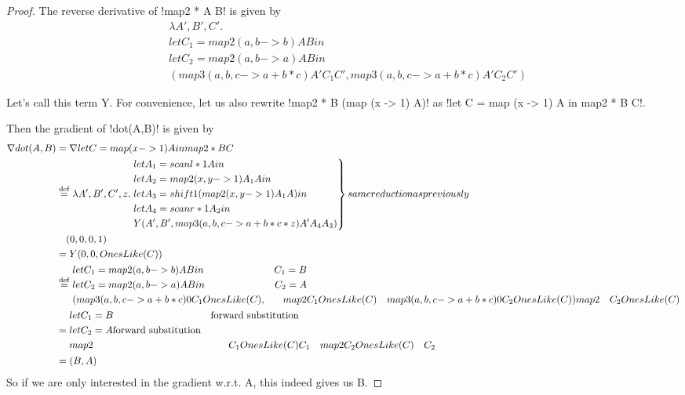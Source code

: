  \begin{proof}
The reverse derivative of !map2 * A B! is given by 
\begin{align*}
    & \lambda A',B',C'. \\
    & let C_1 =map2 (a,b -> b) A B in \\
    & let C_2 =map2 (a,b -> a) A B in \\
    & (map3 (a,b,c -> a+b*c) A' C_1 C', map3 (a,b,c -> a+b*c) A' C_2 C')
\end{align*}

Let's call this term Y.
For convenience, let us also rewrite !map2 * B (map (x -> 1) A)! 
as !let C = map (x -> 1) A in map2 * B C!.

Then the gradient of !dot(A,B)! is given by
\begin{align*}
    \nabla dot(A,B) 
    &= \nabla let C = map (x -> 1) A in map2 * B C\\
    &\stackrel {\mathrm{def}}= \lambda A',B',C',z. 
    \left.\begin{aligned}
        & let A_1 = scanl * 1 A in \\
        & let A_2 = map2 (x,y -> 1) A_1 A in \\
        & let A_3 = shift1 (map2 (x,y -> 1) A_1 A) in \\
        & let A_4 = scanr * 1 A_2 in \\
        & Y(A', B', map3 (a,b,c -> a+b*c*z) A' A_4 A_3)
    \end{aligned}\right\}same reduction as previously
    \\
    &\quad(0,0,0,1) \\
    &= Y(0,0,OnesLike(C)) \\
    &\stackrel {\mathrm{def}}= 
    \begin{aligned}
        & let C_1 =map2 (a,b -> b) A B in & C_1 = B\\
        & let C_2 =map2 (a,b -> a) A B in & C_2 = A\\
        & (map3 (a,b,c -> a+b*c) 0 C_1 OnesLike(C), & map2 & C_1 OnesLike(C)
        & map3 (a,b,c -> a+b*c) 0 C_2 OnesLike(C)) & map2 & C_2 OnesLike(C)
    \end{aligned}\\
    &= \begin{aligned}
        & let C_1 = B & \text{forward substitution}\\
        & let C_2 = A \text{forward substitution}\\
        & map2 & C_1 OnesLike(C) & C_1
        & map2 & C_2 OnesLike(C) & C_2
    \end{aligned}\\
    &= (B, A)
\end{align*}
So if we are only interested in the gradient w.r.t. A, this indeed gives us B.
 \end{proof}
